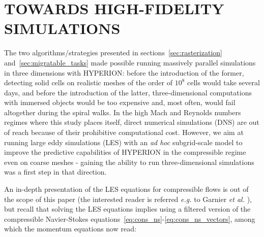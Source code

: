 \section{TOWARDS HIGH-FIDELITY SIMULATIONS}\label{sec:high_fidelity}
%
%

The two algorithms/strategies presented in sections~\ref{sec:rasterization} and~\ref{sec:migratable_tasks} made possible running massively parallel simulations in three dimensions with HYPERION: before the introduction of the former, detecting solid cells on realistic meshes of the order of $10^8$ cells would take several days, and before the introduction of the latter, three-dimensional computations with immersed objects would be too expensive and, most often, would fail altogether during the spiral walks.
In the high Mach and Reynolds numbers regimes where this study places itself, direct numerical simulations (DNS) are out of reach because of their prohibitive computational cost.
However, we aim at running large eddy simulations (LES) with an \emph{ad hoc} subgrid-scale model to improve the predictive capabilities of HYPERION in the compressible regime even on coarse meshes - gaining the ability to run three-dimensional simulations was a first step in that direction.

An in-depth presentation of the LES equations for compressible flows is out of the scope of this paper (the interested reader is referred \emph{e.g.} to Garnier \emph{et al.} \cite{Garnier2009}), but recall that solving the LES equations implies using a filtered version of the compressible Navier-Stokes equations~\eqref{eq:cons_ns}-\eqref{eq:cons_ns_vectors}, among which the momentum equations now read:

